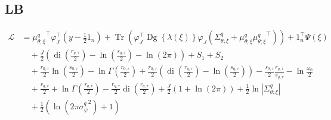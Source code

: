 \documentclass[11pt]{article}
\DeclareMathOperator{\Tr}{Tr}
\newcommand{\opn}{\operatorname}
\begin{document}
\subsection{LB}
\begin{align*}
  \mathcal{L} &= {\mu_{\theta;\xi}^{q}}^{\top}\varphi_{J}^{\top}\left(y -\frac{1}{2}1_{n}\right) + \Tr\left(\varphi_{J}^{\top}\opn{Dg}\left\{\lambda\left(\xi\right) \right\}\varphi_{J}\left(\Sigma_{\theta;\xi}^{q}+\mu_{\theta;\xi}^{q}{\mu_{\theta;\xi}^{q}}^{\top}\right)\right) + 1_{n}^{\top}\Psi\left(\xi\right)\\
  &\quad +\frac{J}{2}\left(\opn{di}\left(\frac{r_{q,\tau}}{2}\right)-\ln\left(\frac{s_{q,\tau}}{2}\right)-\ln\left(2\pi\right)\right) +S_{1}+S_{2}\\
  &\quad +\frac{r_{0,\tau}}{2}\ln\left(\frac{s_{0,\tau}}{2}\right)-\ln\Gamma\left(\frac{r_{0,\tau}}{2}\right) + \frac{r_{0,\tau}}{2}\left(\opn{di}\left(\frac{r_{q,\tau}}{2}\right)-\ln\left(\frac{s_{q,\tau}}{2}\right)\right) - \frac{s_{0,\tau}}{2}\frac{r_{q,\tau}}{s_{q,\tau}} -\ln\frac{\omega_{0}}{2}\\
  &\quad +\frac{r_{q,\tau}}{2} + \ln\Gamma\left(\frac{r_{q,\tau}}{2}\right) -\frac{r_{q,\tau}}{2}\opn{di}\left(\frac{r_{q,\tau}}{2}\right) + \frac{J}{2}\left(1+\ln\left(2\pi\right)\right) + \frac{1}{2}\ln\left|\Sigma_{\theta;\xi}^{q}\right|\\
  &\quad + \frac{1}{2}\left(\ln\left(2\pi{\sigma_{\psi}^{q}}^{2}\right)+1\right)
\end{align*}
\end{document}
